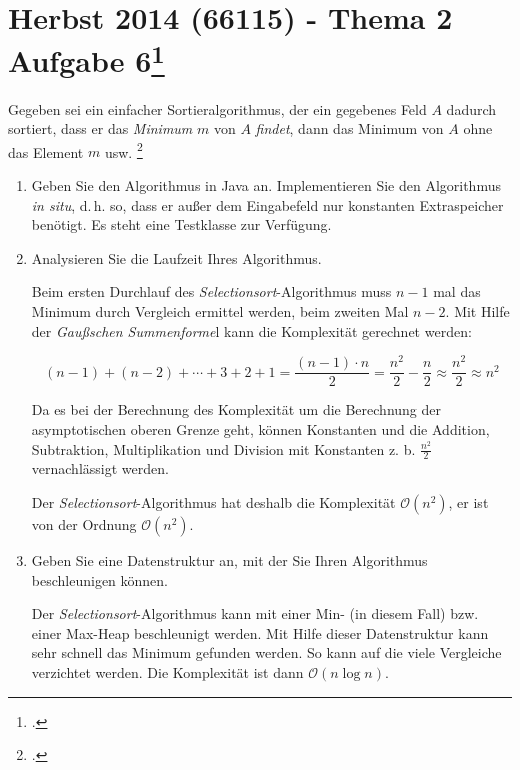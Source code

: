 \documentclass{lehramt-informatik-minimal}
\begin{document}
\section{Herbst 2014 (66115) - Thema 2 Aufgabe 6\footcite[Aufgabe 4,
Seite 4]{aud:ab:3}}

Gegeben sei ein einfacher Sortieralgorithmus, der ein gegebenes Feld $A$
dadurch sortiert, dass er das \emph{Minimum} $m$ von $A$ \emph{findet},
dann das Minimum von $A$ ohne das Element $m$ usw.
\footcite[Thema 2 Aufgabe 6, Seite 5]{examen:66115:2014:09}

\begin{enumerate}


\item Geben Sie den Algorithmus in Java an. Implementieren Sie den
Algorithmus \emph{in situ}, d.\,h. so, dass er außer dem Eingabefeld nur
konstanten Extraspeicher benötigt. Es steht eine Testklasse zur
Verfügung.

\begin{antwort}
\end{antwort}


\item Analysieren Sie die Laufzeit Ihres Algorithmus.

\begin{antwort}
Beim ersten Durchlauf des \emph{Selectionsort}-Algorithmus muss $n - 1$
mal das Minimum durch Vergleich ermittel werden, beim zweiten Mal
$n - 2$.
Mit Hilfe der \emph{Gaußschen Summenforme}l kann die Komplexität
gerechnet werden:

\begin{displaymath}
(n-1)+(n-2)+\dotsb+3+2+1 =
\frac{(n-1)\cdot n}{2} =
\frac{n^2}{2}-\frac{n}{2} \approx
\frac{n^2}{2} \approx
n^2
\end{displaymath}

Da es bei der Berechnung des Komplexität um die Berechnung der
asymptotischen oberen Grenze geht, können Konstanten und die Addition,
Subtraktion, Multiplikation und Division mit Konstanten z. b.
$\frac{n^2}{2}$ vernachlässigt werden.

Der \emph{Selectionsort}-Algorithmus hat deshalb die Komplexität
$\mathcal{O}(n^2)$, er ist von der Ordnung
$\mathcal{O}(n^2)$.
\end{antwort}


\item Geben Sie eine Datenstruktur an, mit der Sie Ihren Algorithmus
beschleunigen können.

\begin{antwort}
Der \emph{Selectionsort}-Algorithmus kann mit einer Min- (in diesem
Fall) bzw. einer Max-Heap beschleunigt werden. Mit Hilfe dieser
Datenstruktur kann sehr schnell das Minimum gefunden werden. So kann auf
die viele Vergleiche verzichtet werden. Die Komplexität ist dann
$\mathcal{O}(n \log n)$.
\end{antwort}
\end{enumerate}
\end{document}
